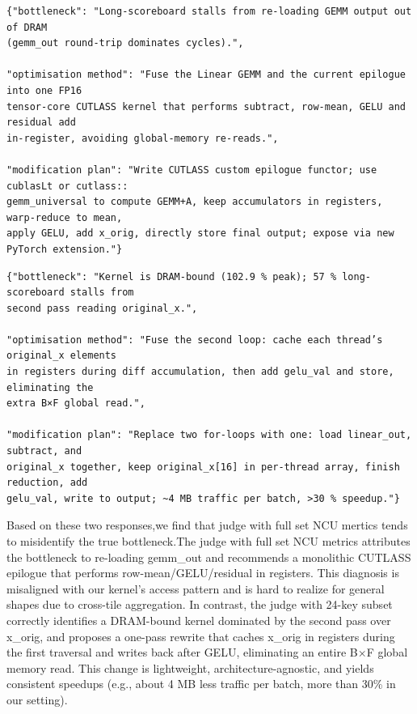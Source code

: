 \begin{tcolorbox}[mybox, title={Response by using the full NCU metrics set}]
\ttfamily 
\begin{verbatim}
{"bottleneck": "Long-scoreboard stalls from re-loading GEMM output out of DRAM
(gemm_out round-trip dominates cycles).",

"optimisation method": "Fuse the Linear GEMM and the current epilogue into one FP16
tensor-core CUTLASS kernel that performs subtract, row-mean, GELU and residual add
in-register, avoiding global-memory re-reads.",

"modification plan": "Write CUTLASS custom epilogue functor; use cublasLt or cutlass::
gemm_universal to compute GEMM+A, keep accumulators in registers, warp-reduce to mean,
apply GELU, add x_orig, directly store final output; expose via new PyTorch extension."}
\end{verbatim}
\normalfont
\end{tcolorbox}

\begin{tcolorbox}[redbox, title={Response by using the 24 key NCU subset}]
\ttfamily 
\begin{verbatim}
{"bottleneck": "Kernel is DRAM-bound (102.9 % peak); 57 % long-scoreboard stalls from
second pass reading original_x.",

"optimisation method": "Fuse the second loop: cache each thread’s original_x elements
in registers during diff accumulation, then add gelu_val and store, eliminating the 
extra B×F global read.",

"modification plan": "Replace two for-loops with one: load linear_out, subtract, and
original_x together, keep original_x[16] in per-thread array, finish reduction, add 
gelu_val, write to output; ~4 MB traffic per batch, >30 % speedup."}
\end{verbatim}
\normalfont
\end{tcolorbox}
Based on these two responses,we find that judge with full set NCU mertics tends to misidentify the true bottleneck.The judge with full set NCU metrics attributes the bottleneck to re-loading gemm\_out and recommends a monolithic CUTLASS epilogue that performs row-mean/GELU/residual in registers. This diagnosis is misaligned with our kernel’s access pattern and is hard to realize for general shapes due to cross-tile aggregation. In contrast, the judge with 24-key subset correctly identifies a DRAM-bound kernel dominated by the second pass over x\_orig, and proposes a one-pass rewrite that caches x\_orig in registers during the first traversal and writes back after GELU, eliminating an entire B×F global memory read. This change is lightweight, architecture-agnostic, and yields consistent speedups (e.g., about 4 MB less traffic per batch, more than 30\% in our setting).


